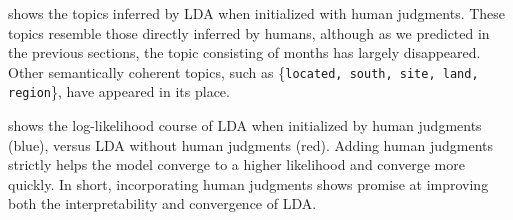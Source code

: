  shows the topics inferred by LDA when
initialized with human judgments.  These topics resemble those
directly inferred by humans, although as we predicted in the previous
sections, the topic consisting of months has largely disappeared.
Other semantically coherent topics, such as \{\texttt{located, south,
  site, land, region}\}, have appeared in its place.

 shows the log-likelihood course of LDA when
initialized by human judgments (blue), versus LDA without human
judgments (red).  Adding human judgments strictly helps the model
converge to a higher likelihood and converge more quickly.  In short,
incorporating human judgments shows promise at improving both the
interpretability and convergence of LDA.
